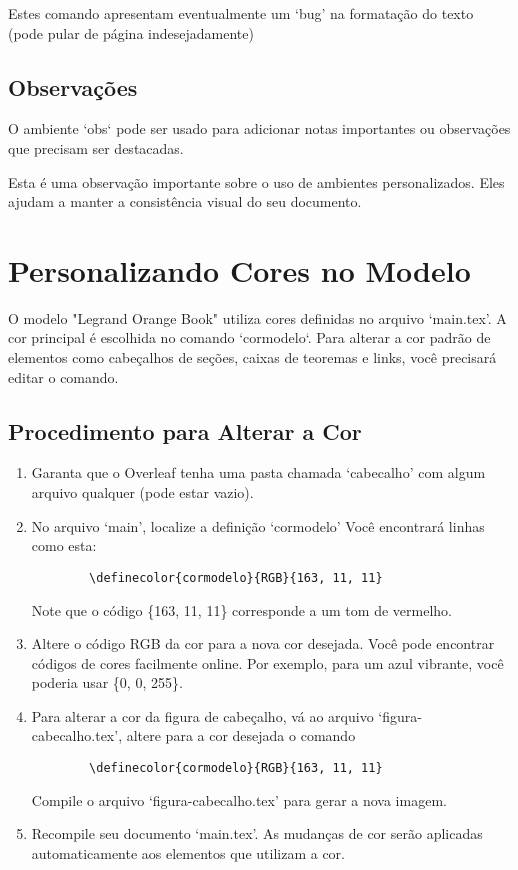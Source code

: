 \begin{obs}
    Estes comando apresentam eventualmente um `bug' na formatação do texto (pode pular de página indesejadamente)
\end{obs}

\subsection{Observações}
O ambiente `obs` pode ser usado para adicionar notas importantes ou observações que precisam ser destacadas.

\begin{obs}
    Esta é uma observação importante sobre o uso de ambientes personalizados. Eles ajudam a manter a consistência visual do seu documento. 
\end{obs}

\section{Personalizando Cores no Modelo}

O modelo "Legrand Orange Book" utiliza cores definidas no arquivo `main.tex'. A cor principal é escolhida no comando `cormodelo`. Para alterar a cor padrão de elementos como cabeçalhos de seções, caixas de teoremas e links, você precisará editar o comando.

\subsection{Procedimento para Alterar a Cor}
\begin{enumerate}
    \item Garanta que o Overleaf tenha uma pasta chamada `cabecalho' com algum arquivo qualquer (pode estar vazio).

    \item No arquivo `main', localize a definição `cormodelo'
    Você encontrará linhas como esta: 
    \begin{verbatim}
        \definecolor{cormodelo}{RGB}{163, 11, 11}
    \end{verbatim}
    Note que o código \{163, 11, 11\} corresponde a um tom de vermelho.

    \item Altere o código RGB da cor para a nova cor desejada. Você pode encontrar códigos de cores facilmente online. Por exemplo, para um azul vibrante, você poderia usar \{0, 0, 255\}.

    \item Para alterar a cor da figura de cabeçalho, vá ao arquivo `figura-cabecalho.tex', altere para a cor desejada o comando
    \begin{verbatim}
        \definecolor{cormodelo}{RGB}{163, 11, 11}
    \end{verbatim}
    
    Compile o arquivo `figura-cabecalho.tex' para gerar a nova imagem.

    \item Recompile seu documento `main.tex'. As mudanças de cor serão aplicadas automaticamente aos elementos que utilizam a cor.
\end{enumerate}

